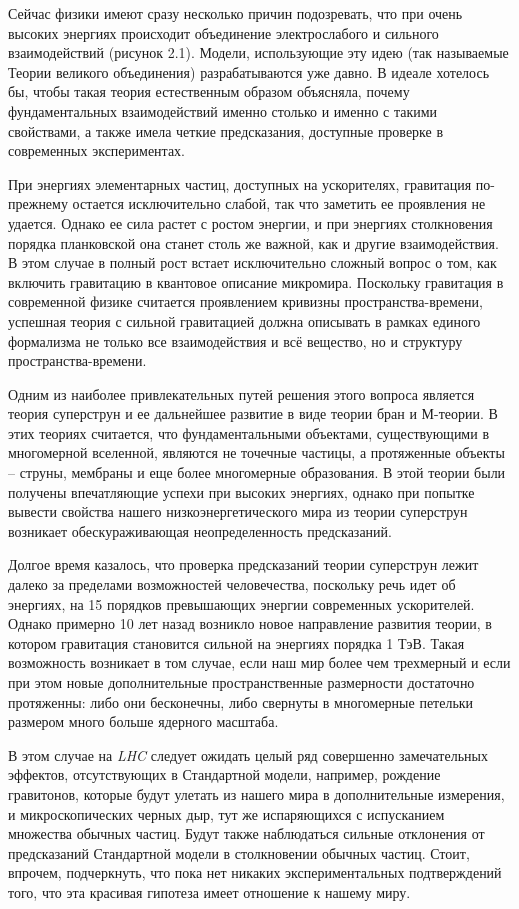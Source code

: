 Сейчас физики имеют сразу несколько причин подозревать, что при очень высоких энергиях происходит объединение электрослабого и сильного взаимодействий (рисунок 2.1). Модели, использующие эту идею (так называемые Теории великого объединения) разрабатываются уже давно. В идеале хотелось бы, чтобы такая теория естественным образом объясняла, почему фундаментальных взаимодействий именно столько и именно с такими свойствами, а также имела четкие предсказания, доступные проверке в современных экспериментах.

При энергиях элементарных частиц, доступных на ускорителях, гравитация по-прежнему остается исключительно слабой, так что заметить ее проявления не удается. Однако ее сила растет с ростом энергии, и при энергиях столкновения порядка планковской она станет столь же важной, как и другие взаимодействия. В этом случае в полный рост встает исключительно сложный вопрос о том, как включить гравитацию в квантовое описание микромира. Поскольку гравитация в современной физике считается проявлением кривизны пространства-времени, успешная теория с сильной гравитацией должна описывать в рамках единого формализма не только все взаимодействия и всё вещество, но и структуру пространства-времени.

Одним из наиболее привлекательных путей решения этого вопроса является теория суперструн и ее дальнейшее развитие в виде теории бран и М-теории. В этих теориях считается, что фундаментальными объектами, существующими в многомерной вселенной, являются не точечные частицы, а протяженные объекты -- струны, мембраны и еще более многомерные образования. В этой теории были получены впечатляющие успехи при высоких энергиях, однако при попытке вывести свойства нашего низкоэнергетического мира из теории суперструн возникает обескураживающая неопределенность предсказаний.

Долгое время казалось, что проверка предсказаний теории суперструн лежит далеко за пределами возможностей человечества, поскольку речь идет об энергиях, на 15 порядков превышающих энергии современных ускорителей. Однако примерно 10 лет назад возникло новое направление развития теории, в котором гравитация становится сильной на энергиях порядка 1 ТэВ. Такая возможность возникает в том случае, если наш мир более чем трехмерный и если при этом новые дополнительные пространственные размерности достаточно протяженны: либо они бесконечны, либо свернуты в многомерные петельки размером много больше ядерного масштаба.

В этом случае на \textit{LHC} следует ожидать целый ряд совершенно замечательных эффектов, отсутствующих в Стандартной модели, например, рождение гравитонов, которые будут улетать из нашего мира в дополнительные измерения, и микроскопических черных дыр, тут же испаряющихся с испусканием множества обычных частиц. Будут также наблюдаться сильные отклонения от предсказаний Стандартной модели в столкновении обычных частиц. Стоит, впрочем, подчеркнуть, что пока нет никаких экспериментальных подтверждений того, что эта красивая гипотеза имеет отношение к нашему миру.

